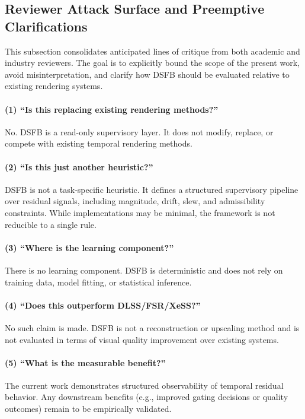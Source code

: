 \documentclass[11pt,letterpaper]{article}
\theoremstyle{gcresult}
\theoremstyle{definition}
\begin{document}
\subsection{Reviewer Attack Surface and Preemptive Clarifications}

This subsection consolidates anticipated lines of critique from both academic and industry reviewers. The goal is to explicitly bound the scope of the present work, avoid misinterpretation, and clarify how DSFB should be evaluated relative to existing rendering systems.

\paragraph{(1) ``Is this replacing existing rendering methods?''}
No. DSFB is a read-only supervisory layer. It does not modify, replace, or compete with existing temporal rendering methods.

\paragraph{(2) ``Is this just another heuristic?''}
DSFB is not a task-specific heuristic. It defines a structured supervisory pipeline over residual signals, including magnitude, drift, slew, and admissibility constraints. While implementations may be minimal, the framework is not reducible to a single rule.

\paragraph{(3) ``Where is the learning component?''}
There is no learning component. DSFB is deterministic and does not rely on training data, model fitting, or statistical inference.

\paragraph{(4) ``Does this outperform DLSS/FSR/XeSS?''}
No such claim is made. DSFB is not a reconstruction or upscaling method and is not evaluated in terms of visual quality improvement over existing systems.

\paragraph{(5) ``What is the measurable benefit?''}
The current work demonstrates structured observability of temporal residual behavior. Any downstream benefits (e.g., improved gating decisions or quality outcomes) remain to be empirically validated.
\end{document}
